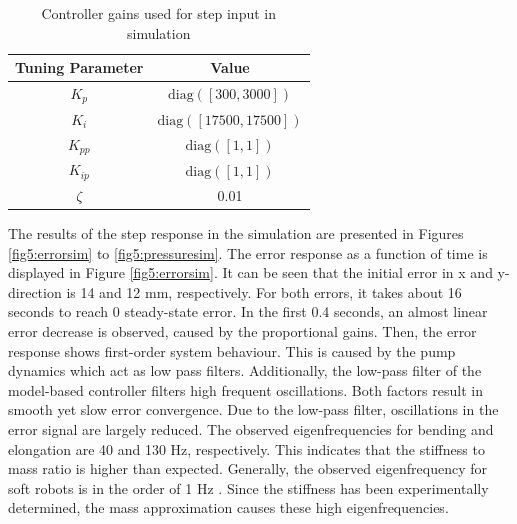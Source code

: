 \begin{table}[H]
    \centering
     \caption{Controller gains used for step input in simulation}
    \begin{tabular}{|c|c|} \hline
     \textbf{Tuning Parameter}    & \textbf{Value}  \\ \hline
    $K_p$ & $\text{diag}([300,3000])$  \\ \hline
    $K_i$ & $\text{diag}([17500,17500])$  \\ \hline
    $K_{pp}$ & $\text{diag}([1,1])$  \\ \hline
    $K_{ip}$ & $\text{diag}([1,1])$ \\ \hline
    $\zeta$ & 0.01 \\ \hline
    \end{tabular}

    \label{tab5:gainssim}
\end{table}

The results of the step response in the simulation are presented in Figures \ref{fig5:errorsim} to \ref{fig5:pressuresim}. The error response as a function of time is displayed in Figure \ref{fig5:errorsim}. It can be seen that the initial error in x and y-direction is 14 and 12 mm, respectively. For both errors, it takes about 16 seconds to reach 0 steady-state error. In the first 0.4 seconds, an almost linear error decrease is observed, caused by the proportional gains. Then, the error response shows first-order system behaviour. This is caused by the pump dynamics which act as low pass filters. Additionally, the low-pass filter of the model-based controller filters high frequent oscillations. Both factors result in smooth yet slow error convergence. Due to the low-pass filter, oscillations in the error signal are largely reduced. The observed eigenfrequencies for bending and elongation are 40 and 130 Hz, respectively. This indicates that the stiffness to mass ratio is higher than expected. Generally, the observed eigenfrequency for soft robots is in the order of 1 Hz \cite{tawk2018bioinspired}. Since the stiffness has been experimentally determined, the mass approximation causes these high eigenfrequencies.





